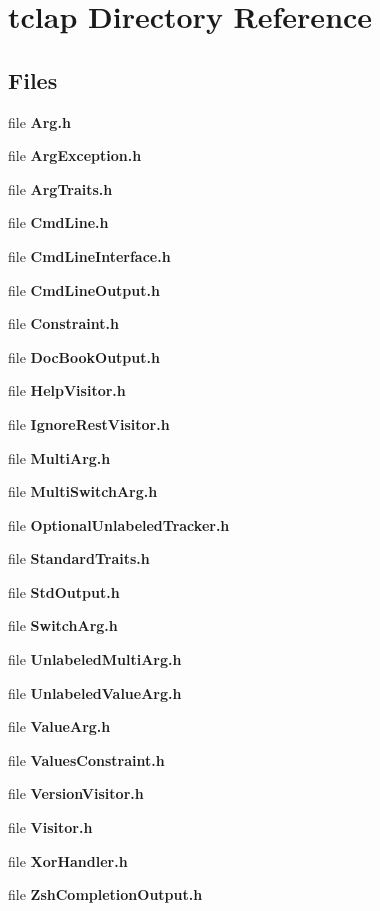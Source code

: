 \section{tclap Directory Reference}
\label{dir_9d22c88629c2ceb49bca629350d4583e}
\subsection*{Files}
\begin{DoxyCompactItemize}
\item 
file {\bf Arg.\+h}
\item 
file {\bf Arg\+Exception.\+h}
\item 
file {\bf Arg\+Traits.\+h}
\item 
file {\bf Cmd\+Line.\+h}
\item 
file {\bf Cmd\+Line\+Interface.\+h}
\item 
file {\bf Cmd\+Line\+Output.\+h}
\item 
file {\bf Constraint.\+h}
\item 
file {\bf Doc\+Book\+Output.\+h}
\item 
file {\bf Help\+Visitor.\+h}
\item 
file {\bf Ignore\+Rest\+Visitor.\+h}
\item 
file {\bf Multi\+Arg.\+h}
\item 
file {\bf Multi\+Switch\+Arg.\+h}
\item 
file {\bf Optional\+Unlabeled\+Tracker.\+h}
\item 
file {\bf Standard\+Traits.\+h}
\item 
file {\bf Std\+Output.\+h}
\item 
file {\bf Switch\+Arg.\+h}
\item 
file {\bf Unlabeled\+Multi\+Arg.\+h}
\item 
file {\bf Unlabeled\+Value\+Arg.\+h}
\item 
file {\bf Value\+Arg.\+h}
\item 
file {\bf Values\+Constraint.\+h}
\item 
file {\bf Version\+Visitor.\+h}
\item 
file {\bf Visitor.\+h}
\item 
file {\bf Xor\+Handler.\+h}
\item 
file {\bf Zsh\+Completion\+Output.\+h}
\end{DoxyCompactItemize}
